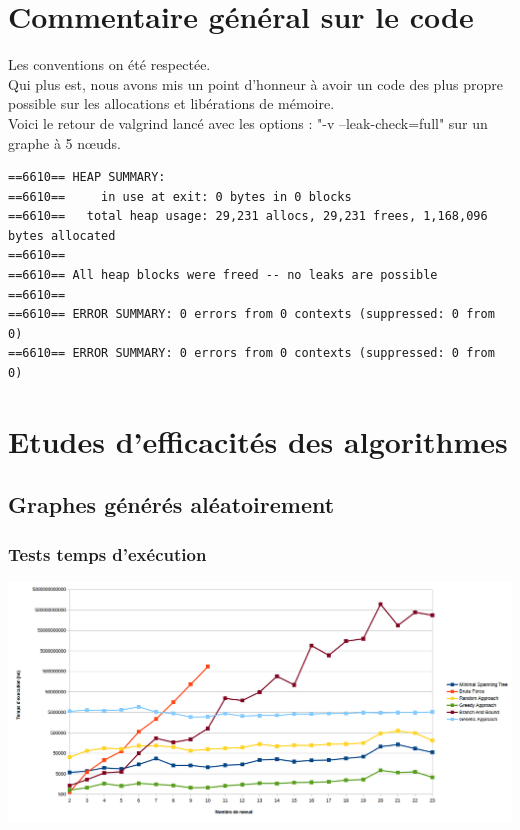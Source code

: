 \documentclass[10pt,a4paper]{report}
\begin{document}
\newpage		
\section{Commentaire général sur le code}

Les conventions on été respectée. \\
Qui plus est, nous avons mis un point d'honneur à avoir un code des plus propre possible sur les allocations et libérations de mémoire. \\

Voici le retour de valgrind lancé avec les options : "-v --leak-check=full" sur un graphe à 5 nœuds. \\
\begin{verbatim}
==6610== HEAP SUMMARY:
==6610==     in use at exit: 0 bytes in 0 blocks
==6610==   total heap usage: 29,231 allocs, 29,231 frees, 1,168,096 bytes allocated
==6610== 
==6610== All heap blocks were freed -- no leaks are possible
==6610== 
==6610== ERROR SUMMARY: 0 errors from 0 contexts (suppressed: 0 from 0)
==6610== ERROR SUMMARY: 0 errors from 0 contexts (suppressed: 0 from 0)
\end{verbatim}

\newpage
\section{Etudes d'efficacités des algorithmes}

	\subsection{Graphes générés aléatoirement}
		\subsubsection{Tests temps d'exécution}
			\includegraphics[scale=0.45]{./Ressource/temps_graphes_random.png}
			
\end{document}

